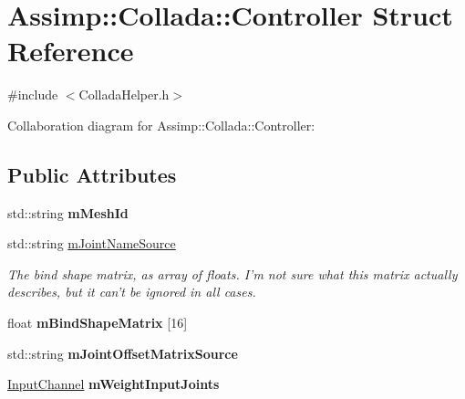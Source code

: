 \hypertarget{struct_assimp_1_1_collada_1_1_controller}{\section{Assimp\+:\+:Collada\+:\+:Controller Struct Reference}
\label{struct_assimp_1_1_collada_1_1_controller}
}


{\ttfamily \#include $<$Collada\+Helper.\+h$>$}



Collaboration diagram for Assimp\+:\+:Collada\+:\+:Controller\+:
\subsection*{Public Attributes}
\begin{DoxyCompactItemize}
\item 
\hypertarget{struct_assimp_1_1_collada_1_1_controller_a5106f1fcdf54972ceac61da95f704d44}{std\+::string {\bfseries m\+Mesh\+Id}}\label{struct_assimp_1_1_collada_1_1_controller_a5106f1fcdf54972ceac61da95f704d44}

\item 
\hypertarget{struct_assimp_1_1_collada_1_1_controller_a4aebae17df1fae48946b44d85fdeeb50}{std\+::string \hyperlink{struct_assimp_1_1_collada_1_1_controller_a4aebae17df1fae48946b44d85fdeeb50}{m\+Joint\+Name\+Source}}\label{struct_assimp_1_1_collada_1_1_controller_a4aebae17df1fae48946b44d85fdeeb50}

\begin{DoxyCompactList}\small\item\em The bind shape matrix, as array of floats. I'm not sure what this matrix actually describes, but it can't be ignored in all cases. \end{DoxyCompactList}\item 
\hypertarget{struct_assimp_1_1_collada_1_1_controller_a27bd977bd33fa943515759efb9bd1256}{float {\bfseries m\+Bind\+Shape\+Matrix} \mbox{[}16\mbox{]}}\label{struct_assimp_1_1_collada_1_1_controller_a27bd977bd33fa943515759efb9bd1256}

\item 
\hypertarget{struct_assimp_1_1_collada_1_1_controller_ad59691f089b1121dd6c71f9925ef21eb}{std\+::string {\bfseries m\+Joint\+Offset\+Matrix\+Source}}\label{struct_assimp_1_1_collada_1_1_controller_ad59691f089b1121dd6c71f9925ef21eb}

\item 
\hypertarget{struct_assimp_1_1_collada_1_1_controller_a4bdb42e346102d1ddbabbc1fa2cc9c70}{\hyperlink{struct_assimp_1_1_collada_1_1_input_channel}{Input\+Channel} {\bfseries m\+Weight\+Input\+Joints}}\label{struct_assimp_1_1_collada_1_1_controller_a4bdb42e346102d1ddbabbc1fa2cc9c70}


\end{DoxyCompactItemize}
